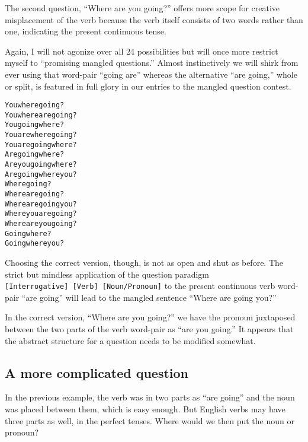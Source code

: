 \documentclass[
  12pt,
  a4paper,
]{article}
\newcommand\pronoun[1]{\textcolor{pronoun}{#1}}
\newcommand\action[1]{\textcolor{action}{#1}}
\begin{document}
The second question, ``Where are you going?'' offers more scope for
creative misplacement of the verb because the verb itself consists of
two words rather than one, indicating the present continuous tense.

Again, I will not agonize over all 24 possibilities but will once more
restrict myself to ``promising mangled questions.'' Almost instinctively
we will shirk from ever using that word-pair ``going are'' whereas the
alternative ``are going,'' whole or split, is featured in full glory in
our entries to the mangled question contest.

\begin{tcolorbox}
\begin{alltt}
\color{normal}
\pronoun{You} where \action{going}?
\pronoun{You} where \action{are going}?
\pronoun{You} \action{going} where?
\pronoun{You} \action{are} where \action{going}?
\pronoun{You} \action{are going} where?
\action{Are going} where?
\action{Are} \pronoun{you} \action{going} where?
\action{Are going} where \pronoun{you}?
Where \action{going}?
Where \action{are going}?
Where \action{are going} \pronoun{you}?
Where \pronoun{you} \action{are going}?
Where \action{are} \pronoun{you} \action{going}?
\action{Going} where?
\action{Going} where \pronoun{you}?
\end{alltt}
\end{tcolorbox}

Choosing the correct version, though, is not as open and shut as before.
The strict but mindless application of the question paradigm
\texttt{{[}Interrogative{]}\ {[}Verb{]}\ {[}Noun/Pronoun{]}} to the
present continuous verb word-pair ``are going'' will lead to the mangled
sentence ``Where are going you?''

In the correct version, ``Where are you going?'' we have the pronoun
juxtaposed between the two parts of the verb word-pair as ``are you
going.'' It appears that the abstract structure for a question needs to
be modified somewhat.

\hypertarget{a-more-complicated-question}{%
\subsection{A more complicated
question}\label{a-more-complicated-question}}

In the previous example, the verb was in two parts as ``are going'' and
the noun was placed between them, which is easy enough. But English
verbs may have three parts as well, in the perfect tenses. Where would
we then put the noun or pronoun?
\end{document}
